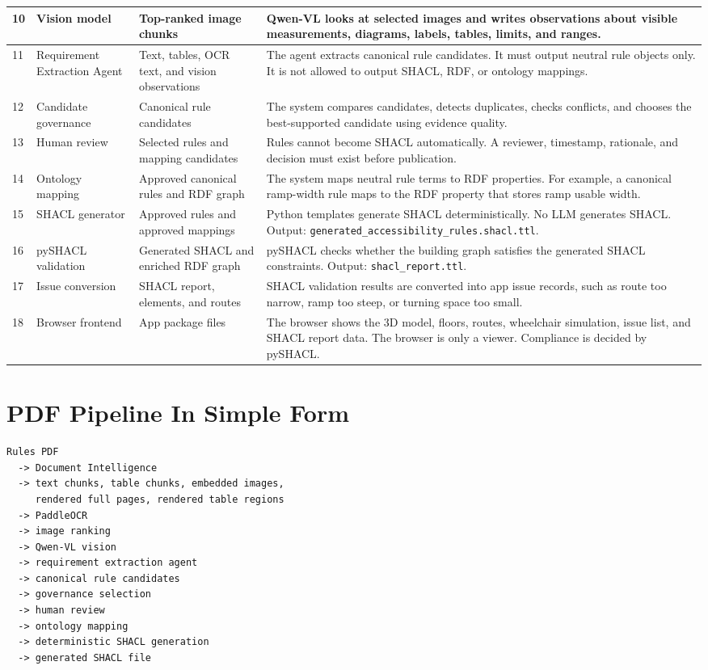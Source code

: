 \documentclass[11pt,a4paper]{article}
\begin{document}
\begin{longtable}{|p{1.2cm}|p{3.5cm}|p{4.2cm}|p{6.3cm}|}
10 & Vision model & Top-ranked image chunks & Qwen-VL looks at selected images and writes observations about visible measurements, diagrams, labels, tables, limits, and ranges. \\
\hline
11 & Requirement Extraction Agent & Text, tables, OCR text, and vision observations & The agent extracts canonical rule candidates. It must output neutral rule objects only. It is not allowed to output SHACL, RDF, or ontology mappings. \\
\hline
12 & Candidate governance & Canonical rule candidates & The system compares candidates, detects duplicates, checks conflicts, and chooses the best-supported candidate using evidence quality. \\
\hline
13 & Human review & Selected rules and mapping candidates & Rules cannot become SHACL automatically. A reviewer, timestamp, rationale, and decision must exist before publication. \\
\hline
14 & Ontology mapping & Approved canonical rules and RDF graph & The system maps neutral rule terms to RDF properties. For example, a canonical ramp-width rule maps to the RDF property that stores ramp usable width. \\
\hline
15 & SHACL generator & Approved rules and approved mappings & Python templates generate SHACL deterministically. No LLM generates SHACL. Output: \texttt{generated\_accessibility\_rules.shacl.ttl}. \\
\hline
16 & pySHACL validation & Generated SHACL and enriched RDF graph & pySHACL checks whether the building graph satisfies the generated SHACL constraints. Output: \texttt{shacl\_report.ttl}. \\
\hline
17 & Issue conversion & SHACL report, elements, and routes & SHACL validation results are converted into app issue records, such as route too narrow, ramp too steep, or turning space too small. \\
\hline
18 & Browser frontend & App package files & The browser shows the 3D model, floors, routes, wheelchair simulation, issue list, and SHACL report data. The browser is only a viewer. Compliance is decided by pySHACL. \\
\hline
\end{longtable}

\section{PDF Pipeline In Simple Form}

\begin{verbatim}
Rules PDF
  -> Document Intelligence
  -> text chunks, table chunks, embedded images,
     rendered full pages, rendered table regions
  -> PaddleOCR
  -> image ranking
  -> Qwen-VL vision
  -> requirement extraction agent
  -> canonical rule candidates
  -> governance selection
  -> human review
  -> ontology mapping
  -> deterministic SHACL generation
  -> generated SHACL file
\end{verbatim}
\end{document}
